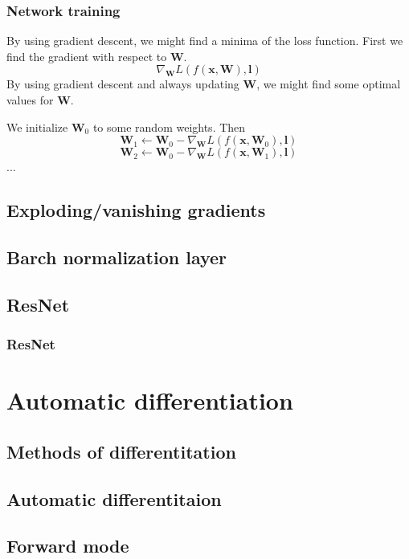 \documentclass{beamer}
\begin{document}
\begin{frame}
    \frametitle{Network training}

    By using gradient descent, we might find a minima of the loss function.
    \pause
    First we find the gradient with respect to $\bm{W}$.
    $$\nabla_{\bm{W}} L(f(\bm{x}, \bm{W}), \bm{l})$$
    \pause
    By using gradient descent and always updating $\bm{W}$, we might find some optimal values for $\bm{W}$.
    \pause

    We initialize $\bm{W}_0$ to some random weights. Then
    \pause
    $$\bm{W}_1 \leftarrow \bm{W}_0 - \nabla_{\bm{W}}L(f(\bm{x}, \bm{W}_0), \bm{l})$$
    \pause
    $$\bm{W}_2 \leftarrow \bm{W}_0 - \nabla_{\bm{W}}L(f(\bm{x}, \bm{W}_1), \bm{l})$$
    ...
\end{frame}

\subsection{Exploding/vanishing gradients}

\subsection{Barch normalization layer}

\subsection{ResNet}

\begin{frame}
    \frametitle{ResNet}
\end{frame}

\section{Automatic differentiation}

\subsection{Methods of differentitation}

\subsection{Automatic differentitaion}

\subsection{Forward mode}
\end{document}
